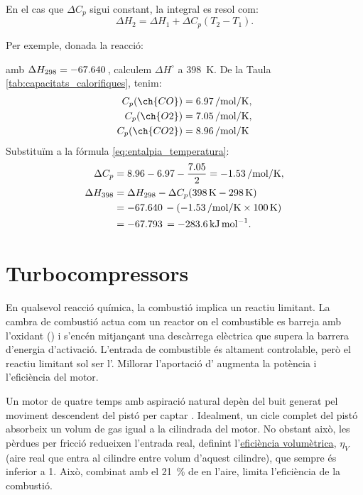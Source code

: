 En el cas que $\Delta C_p$ sigui constant, la integral es resol com:
\begin{equation}
    \Delta H_2 = \Delta H_1 + \Delta C_p (T_2 - T_1).
    \label{eq:entalpia_temperatura}
\end{equation}

\begin{EXMP}
    Per exemple, donada la reacció:
    \begin{center}
    \end{center}
amb $\Delta H_{298} = \qty{-67.640}{\cal}$, calculem $\Delta H^\circ$ a \qty{398}{\kelvin}. De la Taula \ref{tab:capacitats_calorifiques}, tenim:   
\begin{align*}
    C_p(\ch{CO}) &= \qty{6.97}{\cal\per\mole\per\kelvin},\\
    C_p(\ch{O2}) &= \qty{7.05}{\cal\per\mole\per\kelvin},\\
    C_p(\ch{CO2}) &= \qty{8.96}{\cal\per\mole\per\kelvin}
\end{align*}
Substituïm a la fórmula \ref{eq:entalpia_temperatura}:
\begin{align*}
    \Delta C_p &= 8.96 - 6.97 - \frac{7.05}{2} = \qty{-1.53}{\cal\per\mole\per\kelvin},\\
    \Delta H_{398} &= \Delta H_{298} - \Delta C_p (\qty{398}{\kelvin} - \qty{298}{\kelvin})\\
    &= \qty{-67.640}{\cal} - (\qty{-1.53}{\cal\per\mole\per\kelvin} \times \qty{100}{\kelvin})\\
    &= \qty{-67.793}{\cal} = \qty{-283.6}{\kilo\joule\per\mole}.    
\end{align*}
\end{EXMP}

\section{Turbocompressors}

En qualsevol reacció química, la combustió implica un reactiu limitant. La cambra de combustió actua com un reactor on el combustible es barreja amb l'oxidant () i s'encén mitjançant una descàrrega elèctrica que supera la barrera d'energia d'activació. L'entrada de combustible és altament controlable, però el reactiu limitant sol ser l'. Millorar l'aportació d' augmenta la potència i l'eficiència del motor.

Un motor de quatre temps amb aspiració natural depèn del buit generat pel moviment descendent del pistó per captar . Idealment, un cicle complet del pistó absorbeix un volum de gas igual a la cilindrada del motor. No obstant això, les pèrdues per fricció redueixen l'entrada real, definint l'\href{https://x-engineer.org/calculate-volumetric-efficiency/}{eficiència volumètrica}, $\eta_V$ (aire real que entra al cilindre entre volum d'aquest cilindre), que sempre és inferior a 1. Això, combinat amb el \qty{21}{\percent} de  en l'aire, limita l'eficiència de la combustió.

